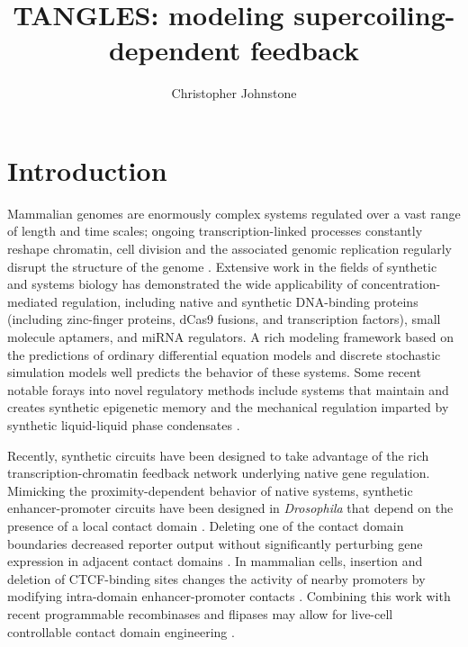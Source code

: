 \documentclass[11pt]{article}
\title{TANGLES: modeling supercoiling-dependent feedback}
\author{Christopher Johnstone}
\date{}
\begin{document}
\maketitle

\section{Introduction}
Mammalian genomes are enormously complex systems regulated over a vast range of length and time scales; ongoing transcription-linked processes constantly reshape chromatin, cell division and the associated genomic replication regularly disrupt the structure of the genome \parencite{johnstoneUnderstandingEngineeringChromatin2020}. Extensive work in the fields of synthetic and systems biology has demonstrated the wide applicability of concentration-mediated regulation, including native and synthetic DNA-binding proteins (including zinc-finger proteins, dCas9 fusions, and transcription factors), small molecule aptamers, and miRNA regulators.
A rich modeling framework based on the predictions of ordinary differential equation models and discrete stochastic simulation models well predicts the behavior of these systems. 
Some recent notable forays into novel regulatory methods include systems that maintain and creates synthetic epigenetic memory \parencite{parkEngineeringEpigeneticRegulation2019} and the mechanical regulation imparted by synthetic liquid-liquid phase condensates \parencite{shinLiquidNuclearCondensates2018}.

Recently, synthetic circuits have been designed to take advantage of the rich transcription-chromatin feedback network underlying native gene regulation. Mimicking the proximity-dependent behavior of native systems, synthetic enhancer-promoter circuits have been designed in \textit{Drosophila} that depend on the presence of a local contact domain \parencite{yokoshiVisualizingRoleBoundary2020}. Deleting one of the contact domain boundaries decreased reporter output without significantly perturbing gene expression in adjacent contact domains \parencite{yokoshiVisualizingRoleBoundary2020}.
In mammalian cells, insertion and deletion of CTCF-binding sites changes the activity of nearby promoters by modifying intra-domain enhancer-promoter contacts \parencite{jiaTandemCTCFSites2020}. Combining this work with recent programmable recombinases and flipases may allow for live-cell controllable contact domain engineering \parencite{guoCRISPRInversionCTCF2015,weinbergHighperformanceChemicalLightinducible2019}.
\end{document}
